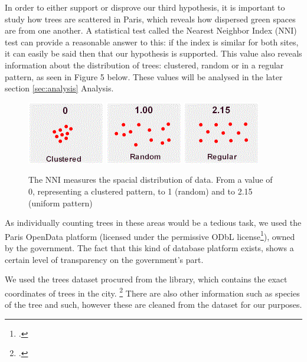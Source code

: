 \documentclass[11pt,letterpaper]{article}
\begin{document}
In order to either support or disprove our third hypothesis, it is important to study how trees are scattered in Paris, which reveals how dispersed green spaces are from one another. A statistical test called the Nearest Neighbor Index (NNI) test can provide a reasonable answer to this: if the index is similar for both sites, it can easily be said then that our hypothesis is supported. This value also reveals information about the distribution of trees: clustered, random or in a regular pattern, as seen in Figure 5 below. These values will be analysed in the later section \ref{sec:analysis} Analysis.

\begin{figure}[H]
    \centering
    \includegraphics[width=0.2\linewidth]{media/nni1.png}
    \includegraphics[width=0.2\linewidth]{media/nni2.png}
    \includegraphics[width=0.2\linewidth]{media/nni3.png}
    \caption{The NNI measures the spacial distribution of data. From a value of 0, representing a clustered pattern, to 1 (random) and to 2.15 (uniform pattern)}
\end{figure}

As individually counting trees in these areas would be a tedious task, we used the Paris OpenData platform (licensed under the permissive ODbL license\footcite{odbl}), owned by the government. The fact that this kind of database platform exists, shows a certain level of transparency on the government's part.

We used the trees dataset procured from the library, which contains the exact coordinates of trees in the city. \footcite{paris_opendata} There are also other information such as species of the tree and such, however these are cleaned from the dataset for our purposes.
\end{document}

